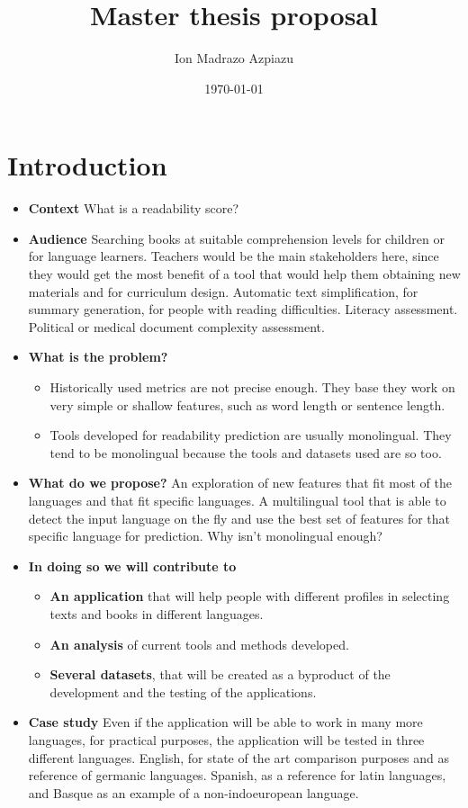 \documentclass[12pt]{article}
\title{Master thesis proposal}
\author{Ion Madrazo Azpiazu}
\date{\today}
\begin{document}
\maketitle
\section{Introduction}
\begin{itemize}
\item \textbf{Context} What is a readability score?
\item \textbf{Audience} Searching books at suitable comprehension levels for children or for language learners. Teachers would be the main stakeholders here, since they would get the most benefit of a tool that would help them obtaining new materials and for curriculum design. Automatic text simplification, for summary generation, for people with reading difficulties. Literacy assessment. Political or medical document complexity assessment. 
\item \textbf{What is the problem?} 
\begin{itemize}
\item Historically used metrics are not precise enough. They base they work on very simple or shallow features, such as word length or sentence length.
\item Tools developed for readability prediction are usually monolingual. They tend to be monolingual because the tools and datasets used are so too.
\end{itemize}  
\item \textbf{What do we propose?} An exploration of new features that fit most of the languages and that fit specific languages. A multilingual tool that is able to detect the input language on the fly and use the best set of features for that specific language for prediction. {\color{red}Why isn't monolingual enough?}

\item \textbf{In doing so we will contribute to}
\begin{itemize}
\item \textbf{An application} that will help people with different profiles in selecting texts and books in different languages.
\item \textbf{An analysis} of current tools and methods developed.
\item \textbf{Several datasets}, that will be created as a byproduct of the development and the testing of the applications. 
\end{itemize}

\item \textbf{Case study} Even if the application will be able to work in many more languages, for practical purposes, the application will be tested in three different languages. English, for state of the art comparison purposes and as reference of germanic languages. Spanish, as a reference for latin languages, and Basque as an example of a non-indoeuropean language.

\end{itemize}
\end{document}
